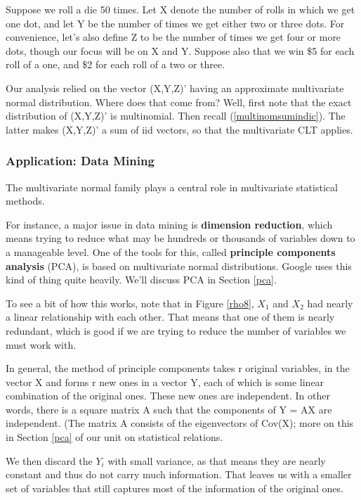 Suppose we roll a die 50 times.  Let X denote the number of rolls in
which we get one dot, and let Y be the number of times we get either two
or three dots.  For convenience, let's also define Z to be the number of
times we get four or more dots, though our focus will be on X and Y.
Suppose also that we win \$5 for each roll of a one, and \$2 for each
roll of a two or three.

Our analysis relied on the vector (X,Y,Z)' having an approximate
multivariate normal distribution.  Where does that come from?  Well,
first note that the exact distribution of (X,Y,Z)' is multinomial.  Then
recall (\ref{multinomsumindic}).  The latter makes (X,Y,Z)' a sum of
iid vectors, so that the multivariate CLT applies.

\subsubsection{Application:  Data Mining}
\label{datamining}

The multivariate normal family plays a central role in multivariate
statistical methods.  

For instance, a major issue in data mining is {\bf dimension reduction},
which means trying to reduce what may be hundreds or thousands of
variables down to a manageable level.  One of the tools for this, called
{\bf principle components analysis} (PCA), is based on multivariate
normal distributions.  Google uses this kind of thing quite heavily.
We'll discuss PCA in Section \ref{pca}.

To see a bit of how this works, note that in Figure \ref{rho8}, $X_1$
and $X_2$ had nearly a linear relationship with each other.  That means
that one of them is nearly redundant, which is good if we are trying to
reduce the number of variables we must work with.

In general, the method of principle components takes r original
variables, in the vector X and forms r new ones in a vector Y, each of
which is some linear combination of the original ones.  These new ones
are independent.  In other words, there is a square matrix A such that
the components of Y = AX are independent.  (The matrix A consists of the
eigenvectors of Cov(X); more on this in Section \ref{pca} of our unit on
statistical relations.

We then discard the $Y_i$ with small variance, as that means they are
nearly constant and thus do not carry much information.  That leaves us
with a smaller set of variables that still captures most of the
information of the original ones.

